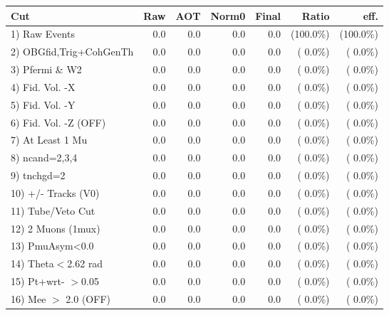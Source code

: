  \begin{table}[h!]\centering
 \begin{tabular}{||l||r|r|r|r|r|r||}
 \hline
 \hline
 Cut & Raw & AOT & Norm0 & Final & Ratio & eff.       \\
 \hline
  1) Raw Events           &          0.0 &          0.0 &          0.0 &          0.0 & (100.0\%) & (100.0\%) \\
  2) OBGfid,Trig+CohGenTh &          0.0 &          0.0 &          0.0 &          0.0 & (  0.0\%) & (  0.0\%) \\
  3) Pfermi \& W2         &          0.0 &          0.0 &          0.0 &          0.0 & (  0.0\%) & (  0.0\%) \\
  4) Fid. Vol. -X         &          0.0 &          0.0 &          0.0 &          0.0 & (  0.0\%) & (  0.0\%) \\
  5) Fid. Vol. -Y         &          0.0 &          0.0 &          0.0 &          0.0 & (  0.0\%) & (  0.0\%) \\
  6) Fid. Vol. -Z (OFF)   &          0.0 &          0.0 &          0.0 &          0.0 & (  0.0\%) & (  0.0\%) \\
  7) At Least 1 Mu        &          0.0 &          0.0 &          0.0 &          0.0 & (  0.0\%) & (  0.0\%) \\
  8) ncand=2,3,4          &          0.0 &          0.0 &          0.0 &          0.0 & (  0.0\%) & (  0.0\%) \\
  9) tnchgd=2             &          0.0 &          0.0 &          0.0 &          0.0 & (  0.0\%) & (  0.0\%) \\
 10) +/- Tracks (V0)      &          0.0 &          0.0 &          0.0 &          0.0 & (  0.0\%) & (  0.0\%) \\
 11) Tube/Veto Cut        &          0.0 &          0.0 &          0.0 &          0.0 & (  0.0\%) & (  0.0\%) \\
 12) 2 Muons (1mux)       &          0.0 &          0.0 &          0.0 &          0.0 & (  0.0\%) & (  0.0\%) \\
 13) PmuAsym<0.0          &          0.0 &          0.0 &          0.0 &          0.0 & (  0.0\%) & (  0.0\%) \\
 14) Theta$<$2.62 rad     &          0.0 &          0.0 &          0.0 &          0.0 & (  0.0\%) & (  0.0\%) \\
 15) Pt+wrt- $>$0.05      &          0.0 &          0.0 &          0.0 &          0.0 & (  0.0\%) & (  0.0\%) \\
 16) Mee $>$ 2.0  (OFF)   &          0.0 &          0.0 &          0.0 &          0.0 & (  0.0\%) & (  0.0\%) \\

\end{tabular}
\end{table}
